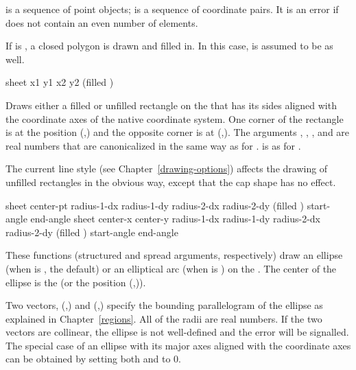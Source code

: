  is a sequence of point objects;  is a sequence of
coordinate pairs.  It is an error if  does not contain an even
number of elements.

If  is , a closed polygon is drawn and filled in.  In
this case,  is assumed to be  as well.


 {sheet x1 y1 x2 y2 \key (filled )
                          \DrawingOptions \LineJointOptions} 

Draws either a filled or unfilled rectangle on the   that
has its sides aligned with the coordinate axes of the native coordinate system.
One corner of the rectangle is at the position (,) and the
opposite corner is at (,).  The arguments , ,
, and  are real numbers that are canonicalized in the same way
as for .   is as for .

The current line style (see Chapter~\ref{drawing-options}) affects the drawing
of unfilled rectangles in the obvious way, except that the cap shape has no
effect.


  {sheet center-pt radius-1-dx radius-1-dy radius-2-dx radius-2-dy
                        \key (filled ) start-angle end-angle
                        \DrawingOptions \LineCapOptions}
 {sheet center-x center-y radius-1-dx radius-1-dy radius-2-dx radius-2-dy
                        \key (filled ) start-angle end-angle
                        \DrawingOptions \LineCapOptions}

These functions (structured and spread arguments, respectively) draw an ellipse
(when  is , the default) or an elliptical arc (when
 is ) on the  .  The center of
the ellipse is the   (or the position
(,)).

Two vectors, (,) and
(,) specify the bounding parallelogram of the
ellipse as explained in Chapter~\ref{regions}.  All of the radii are real
numbers.  If the two vectors are collinear, the ellipse is not well-defined and
the  error will be signalled.  The special case
of an ellipse with its major axes aligned with the coordinate axes can be
obtained by setting both  and  to 0.

